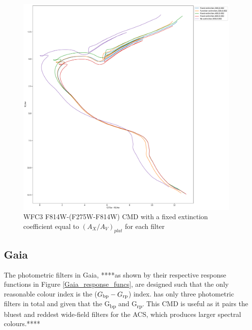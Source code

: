 \documentclass[12pt, a4paper]{report}
\begin{document}
\begin{figure}[h]
\begin{center}
\includegraphics[scale=0.3]{../basti_isochrones_10_13Gyr/Extinction_T50k_FeH0fix_func_f814w_f275wmf814w_500_400_600_Myr_FeH_0p002_ref_noext_Av_1p0.pdf}
\caption{WFC3 F814W-(F275W-F814W) CMD with a fixed extinction coefficient equal to $(A_{X}/A_{V})_{plat}$ for each filter}
\label{wfc3_isoc2_T50k}
\end{center}
\end{figure}

\subsection{Gaia} \label{Gaia_isoc}

The photometric filters in Gaia, ****as shown by their respective response functions in Figure \ref{Gaia_response_funcs}, are designed such that the only reasonable colour index is the ($G_{\textnormal{bp}}-G_{\textnormal{rp}}$) index. has only three photometric filters in total and given that the G\textsubscript{bp} and G\textsubscript{rp}. This CMD is useful as it pairs the bluest and reddest wide-field filters for the ACS, which produces larger spectral colours.****
\end{document}
